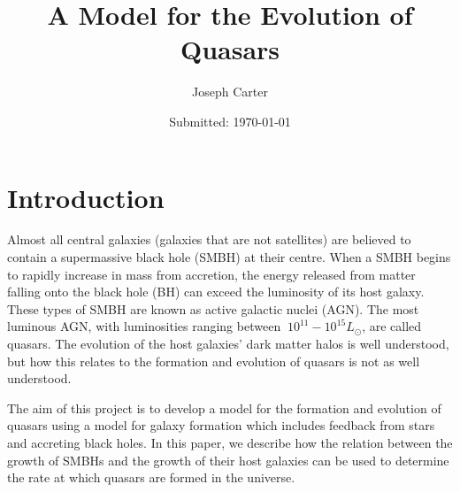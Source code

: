 \documentclass[12pt, twocolumn]{report}%
\begin{document}
                     

\title{A Model for the Evolution of Quasars} 
\date{Submitted: \today{}}
\author{Joseph Carter}

 



\maketitle
\onecolumngrid


\tableofcontents
\newpage
\twocolumngrid


\section{Introduction}

Almost all central galaxies (galaxies that are not satellites) are believed to contain a supermassive black hole (SMBH) at their centre. When a SMBH begins to rapidly increase in mass from accretion, the energy released from matter falling onto the black hole (BH) can exceed the luminosity of its host galaxy. These types of SMBH are known as active galactic nuclei (AGN). The most luminous AGN, with luminosities ranging between $~10^{11} - 10^{15}L_\odot$, are called quasars. The evolution of the host galaxies' dark matter halos is well understood, but how this relates to the formation and evolution of quasars is not as well understood.\par

The aim of this project is to develop a model for the formation and evolution of quasars using a model for galaxy formation which includes feedback from stars and accreting black holes. In this paper, we describe how the relation between the growth of SMBHs and the growth of their host galaxies can be used to determine the rate at which quasars are formed in the universe.
\end{document}
